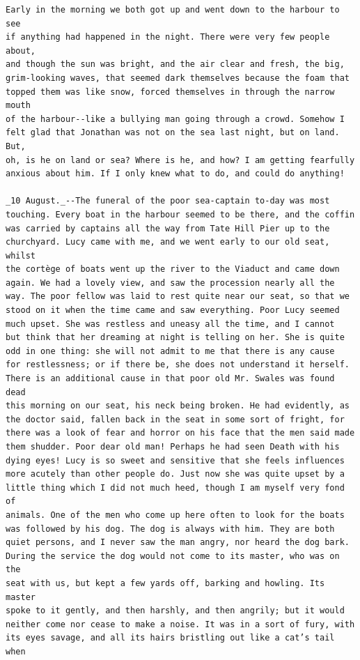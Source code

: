 \documentclass{article}
\begin{document}
\begin{verbatim}
Early in the morning we both got up and went down to the harbour to see
if anything had happened in the night. There were very few people about,
and though the sun was bright, and the air clear and fresh, the big,
grim-looking waves, that seemed dark themselves because the foam that
topped them was like snow, forced themselves in through the narrow mouth
of the harbour--like a bullying man going through a crowd. Somehow I
felt glad that Jonathan was not on the sea last night, but on land. But,
oh, is he on land or sea? Where is he, and how? I am getting fearfully
anxious about him. If I only knew what to do, and could do anything!

_10 August._--The funeral of the poor sea-captain to-day was most
touching. Every boat in the harbour seemed to be there, and the coffin
was carried by captains all the way from Tate Hill Pier up to the
churchyard. Lucy came with me, and we went early to our old seat, whilst
the cortège of boats went up the river to the Viaduct and came down
again. We had a lovely view, and saw the procession nearly all the
way. The poor fellow was laid to rest quite near our seat, so that we
stood on it when the time came and saw everything. Poor Lucy seemed
much upset. She was restless and uneasy all the time, and I cannot
but think that her dreaming at night is telling on her. She is quite
odd in one thing: she will not admit to me that there is any cause
for restlessness; or if there be, she does not understand it herself.
There is an additional cause in that poor old Mr. Swales was found dead
this morning on our seat, his neck being broken. He had evidently, as
the doctor said, fallen back in the seat in some sort of fright, for
there was a look of fear and horror on his face that the men said made
them shudder. Poor dear old man! Perhaps he had seen Death with his
dying eyes! Lucy is so sweet and sensitive that she feels influences
more acutely than other people do. Just now she was quite upset by a
little thing which I did not much heed, though I am myself very fond of
animals. One of the men who come up here often to look for the boats
was followed by his dog. The dog is always with him. They are both
quiet persons, and I never saw the man angry, nor heard the dog bark.
During the service the dog would not come to its master, who was on the
seat with us, but kept a few yards off, barking and howling. Its master
spoke to it gently, and then harshly, and then angrily; but it would
neither come nor cease to make a noise. It was in a sort of fury, with
its eyes savage, and all its hairs bristling out like a cat’s tail when

\end{verbatim}
\end{document}
